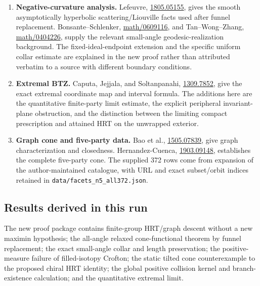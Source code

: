 \documentclass[11pt]{article}
\begin{document}
\begin{enumerate}
  A single fixed pair across arbitrary collisions is not a result of
  that paper.
\item
  \textbf{Negative-curvature analysis.} Lefeuvre,
  \href{https://arxiv.org/abs/1805.05155}{1805.05155}, gives the smooth
  asymptotically hyperbolic scattering/Liouville facts used after funnel
  replacement. Bonsante--Schlenker,
  \href{https://arxiv.org/abs/math/0609116}{math/0609116}, and
  Tan--Wong--Zhang,
  \href{https://arxiv.org/abs/math/0404226}{math/0404226}, supply the
  relevant small-angle geodesic-realization background. The
  fixed-ideal-endpoint extension and the specific uniform collar
  estimate are explained in the new proof rather than attributed
  verbatim to a source with different boundary conditions.
\item
  \textbf{Extremal BTZ.} Caputa, Jejjala, and Soltanpanahi,
  \href{https://arxiv.org/abs/1309.7852}{1309.7852}, give the exact
  extremal coordinate map and interval formula. The additions here are
  the quantitative finite-party limit estimate, the explicit peripheral
  invariant-plane obstruction, and the distinction between the limiting
  compact prescription and attained HRT on the unwrapped exterior.
\item
  \textbf{Graph cone and five-party data.} Bao et al.,
  \href{https://arxiv.org/abs/1505.07839}{1505.07839}, give graph
  characterization and closedness. Hernandez-Cuenca,
  \href{https://arxiv.org/abs/1903.09148}{1903.09148}, establishes the
  complete five-party cone. The supplied 372 rows come from expansion of
  the author-maintained catalogue, with URL and exact subset/orbit
  indices retained in \texttt{data/facets\_\allowbreak n5\_\allowbreak all372.json}.
\end{enumerate}

\subsection{Results derived in this
run}\label{results-derived-in-this-run}

The new proof package contains finite-group HRT/graph descent without a
new maximin hypothesis; the all-angle relaxed cone-functional theorem by
funnel replacement; the exact small-angle collar and length
preservation; the positive-measure failure of filled-isotopy Crofton;
the static tilted cone counterexample to the proposed chiral HRT
identity; the global positive collision kernel and branch-existence
calculation; and the quantitative extremal limit.
\end{document}

